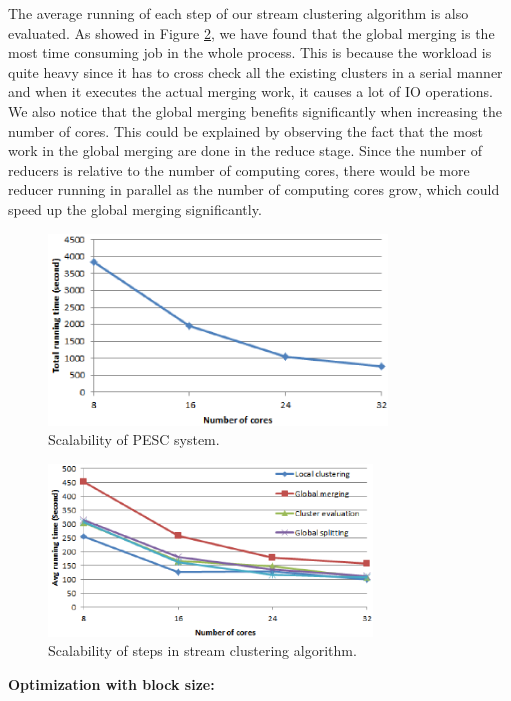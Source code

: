 \documentclass[conference]{IEEEtran}
\begin{document}
The average running of each step of our stream clustering algorithm is also evaluated. As showed in Figure \ref{fig_scalability_phase_cores}, we have found that the global merging is the most time consuming job in the whole process. This is because the workload is quite heavy since it has to cross check all the existing clusters in a serial manner and when it executes the actual merging work, it causes a lot of IO operations. We also notice that the global merging benefits significantly when increasing the number of cores. This could be explained by observing the fact that the most work in the global merging are done in the reduce stage. Since the number of reducers is relative to the number of computing cores, there would be more reducer running in parallel as the number of computing cores grow, which could speed up the global merging significantly.

\begin{figure}[!t]
\centering
\includegraphics[height=2.0in]{./Figure/runningTime_cores.eps}
\caption{Scalability of PESC system.}
\label{fig_scalability_total_cores}
\end{figure}

\begin{figure}[!t]
\centering
\includegraphics[height=1.8in]{./Figure/phase_cores.eps}
\caption{Scalability of steps in stream clustering algorithm.}
\label{fig_scalability_phase_cores}
\end{figure}

\textbf{Optimization with block size: }
\end{document}
